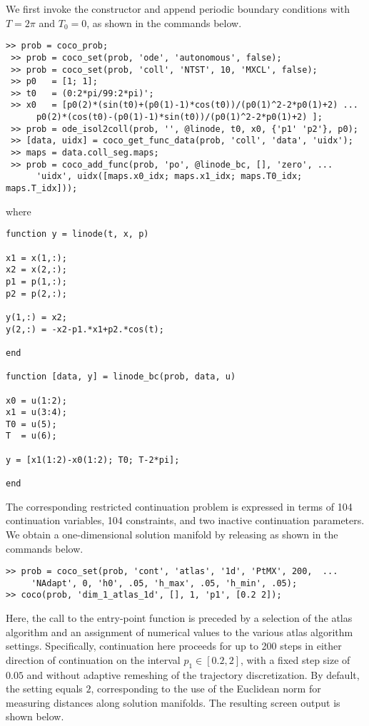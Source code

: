 We first invoke the  constructor and append periodic boundary conditions with $T=2\pi$ and $T_0=0$, as shown in the commands below.
\begin{lstlisting}[language=coco-highlight]
 >> prob = coco_prob;
 >> prob = coco_set(prob, 'ode', 'autonomous', false);
 >> prob = coco_set(prob, 'coll', 'NTST', 10, 'MXCL', false);
 >> p0   = [1; 1];
 >> t0   = (0:2*pi/99:2*pi)';
 >> x0   = [p0(2)*(sin(t0)+(p0(1)-1)*cos(t0))/(p0(1)^2-2*p0(1)+2) ...
      p0(2)*(cos(t0)-(p0(1)-1)*sin(t0))/(p0(1)^2-2*p0(1)+2) ];
 >> prob = ode_isol2coll(prob, '', @linode, t0, x0, {'p1' 'p2'}, p0);
 >> [data, uidx] = coco_get_func_data(prob, 'coll', 'data', 'uidx');
 >> maps = data.coll_seg.maps;
 >> prob = coco_add_func(prob, 'po', @linode_bc, [], 'zero', ...
      'uidx', uidx([maps.x0_idx; maps.x1_idx; maps.T0_idx; maps.T_idx]));
\end{lstlisting}
where
 \begin{lstlisting}[language=coco-highlight]
function y = linode(t, x, p)

x1 = x(1,:);
x2 = x(2,:);
p1 = p(1,:);
p2 = p(2,:);

y(1,:) = x2;
y(2,:) = -x2-p1.*x1+p2.*cos(t);

end

function [data, y] = linode_bc(prob, data, u)

x0 = u(1:2);
x1 = u(3:4);
T0 = u(5);
T  = u(6);

y = [x1(1:2)-x0(1:2); T0; T-2*pi];

end
\end{lstlisting}
The corresponding restricted continuation problem is expressed in terms of 104 continuation variables, 104 constraints, and two inactive continuation parameters. We obtain a one-dimensional solution manifold by releasing  as shown in the commands below.
 \begin{lstlisting}[language=coco-highlight]
 >> prob = coco_set(prob, 'cont', 'atlas', '1d', 'PtMX', 200,  ...
     'NAdapt', 0, 'h0', .05, 'h_max', .05, 'h_min', .05);
>> coco(prob, 'dim_1_atlas_1d', [], 1, 'p1', [0.2 2]);
\end{lstlisting}
 Here, the call to the  entry-point function is preceded by a selection of the  atlas algorithm and an assignment of numerical values to the various atlas algorithm settings. Specifically, continuation here proceeds for up to 200 steps in either direction of continuation on the interval $p_1\in[0.2,2]$, with a fixed step size of $0.05$ and without adaptive remeshing of the trajectory discretization. By default, the  setting equals $2$, corresponding to the use of the Euclidean norm for measuring distances along solution manifolds. The resulting screen output is shown below.
